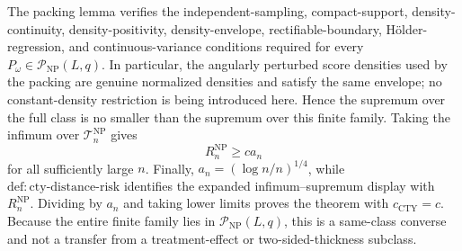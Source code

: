 The packing lemma verifies the independent-sampling, compact-support, density-continuity, density-positivity, density-envelope, rectifiable-boundary, H\"older-regression, and continuous-variance conditions required for every \(P_\omega\in\mathcal P_{\mathrm{NP}}(L,q)\).  In particular, the angularly perturbed score densities used by the packing are genuine normalized densities and satisfy the same envelope; no constant-density restriction is being introduced here.  Hence the supremum over the full class is no smaller than the supremum over this finite family.  Taking the infimum over \(\mathcal T_n^{\mathrm{NP}}\) gives
\[
 R_n^{\mathrm{NP}}\geq c a_n
\]
for all sufficiently large \(n\).  Finally, \(a_n=(\log n/n)^{1/4}\), while \(\mathrm{def:cty\text{-}distance\text{-}risk}\) identifies the expanded infimum--supremum display with \(R_n^{\mathrm{NP}}\).  Dividing by \(a_n\) and taking lower limits proves the theorem with \(c_{\mathrm{CTY}}=c\).  Because the entire finite family lies in \(\mathcal P_{\mathrm{NP}}(L,q)\), this is a same-class converse and not a transfer from a treatment-effect or two-sided-thickness subclass.